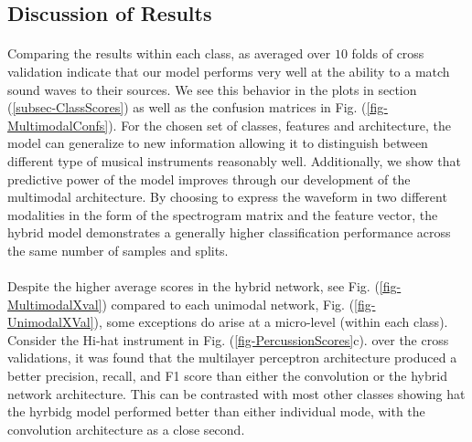 \documentclass[12pt,letterpaper]{article}
\begin{document}

\subsection{Discussion of Results}

\paragraph*{}Comparing the results within each class, as averaged over $10$ folds of cross validation indicate that our model performs very well at the ability to a match sound waves to their sources. We see this behavior in the plots in section (\ref{subsec-ClassScores}) as well as the confusion matrices in Fig. (\ref{fig-MultimodalConfs}). For the chosen set of classes, features and architecture, the model can generalize to new information allowing it to distinguish between different type of musical instruments reasonably well. Additionally, we show that predictive power of the model improves through our development of the multimodal architecture. By choosing to express the waveform in two different modalities in the form of the spectrogram matrix and the feature vector, the hybrid model demonstrates a generally higher classification performance across the same number of samples and splits. 

\paragraph*{}Despite the higher average scores in the hybrid network, see Fig. (\ref{fig-MultimodalXval}) compared to each unimodal network, Fig. (\ref{fig-UnimodalXVal}), some exceptions do arise at a micro-level (within each class). Consider the Hi-hat instrument in Fig. (\ref{fig-PercussionScores}c). over the cross validations, it was found that the multilayer perceptron architecture produced a better precision, recall, and F1 score than either the convolution or the hybrid network architecture. This can be contrasted with most other classes showing hat the hyrbidg model performed better than either individual mode, with the convolution architecture as a close second. 
\end{document}
